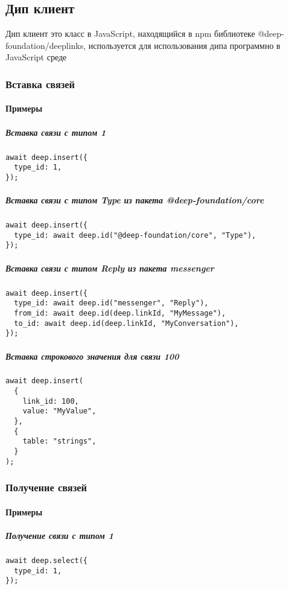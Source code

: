 \documentclass{article}
\begin{document}
\subsection{Дип клиент}
Дип клиент это класс в JavaScript, находящийся в npm библиотеке
@deep-foundation/deeplinks, используется для использования дипа
программно в JavaScript среде

\subsubsection{Вставка связей}

\paragraph{Примеры}

\subparagraph{Вставка связи с типом 1}
\begin{lstlisting}
await deep.insert({
  type_id: 1,
});
\end{lstlisting}

\subparagraph{Вставка связи с типом Type из пакета @deep-foundation/core}
\begin{lstlisting}
await deep.insert({
  type_id: await deep.id("@deep-foundation/core", "Type"),
});
\end{lstlisting}

\subparagraph{Вставка связи с типом Reply из пакета messenger}
\begin{lstlisting}
await deep.insert({
  type_id: await deep.id("messenger", "Reply"),
  from_id: await deep.id(deep.linkId, "MyMessage"),
  to_id: await deep.id(deep.linkId, "MyConversation"),
});
\end{lstlisting}

\subparagraph{Вставка строкового значения для связи 100}
\begin{lstlisting}
await deep.insert(
  {
    link_id: 100,
    value: "MyValue",
  },
  {
    table: "strings",
  }
);
\end{lstlisting}

\subsubsection{Получение связей}

\paragraph{Примеры}

\subparagraph{Получение связи с типом 1}
\begin{lstlisting}
await deep.select({
  type_id: 1,
});
\end{lstlisting}
\end{document}
